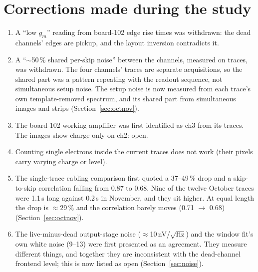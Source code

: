 \documentclass[11pt]{article}
\begin{document}
\section{Corrections made during the study}\label{sec:corrections}
\begin{enumerate}
\item A ``low $g_m$'' reading from board-102 edge rise times was withdrawn: the dead channels' edges are pickup, and the
  layout inversion contradicts it.
\item A ``$\sim$50\,\% shared per-skip noise'' between the channels, measured on traces, was withdrawn. The four
  channels' traces are separate acquisitions, so the shared part was a pattern repeating with the readout sequence, not
  simultaneous setup noise. The setup noise is now measured from each trace's own template-removed spectrum, and its
shared part from simultaneous images and strips (Section~\ref{sec:octnov}).
\item The board-102 working amplifier was first identified as ch3 from its traces. The images show charge only on ch2:
  open.
\item Counting single electrons inside the current traces does not work (their pixels carry varying charge or level).
\item The single-trace cabling comparison first quoted a 37--49\,\% drop and a skip-to-skip correlation falling from 0.87
  to 0.68. Nine of the twelve October traces were 1.1\,s long against 0.2\,s in November, and they sit higher. At equal
  length the drop is $\approx$29\,\% and the correlation barely moves (0.71 $\to$ 0.68) (Section~\ref{sec:octnov}).
\item The live-minus-dead output-stage noise ($\approx$10\,nV/$\sqrt{\text{Hz}}$) and the window fit's own white noise
  (9--13) were first presented as an agreement. They measure different things, and together they are inconsistent with
  the dead-channel frontend level; this is now listed as open (Section~\ref{sec:noise}).
\end{enumerate}

\end{document}
